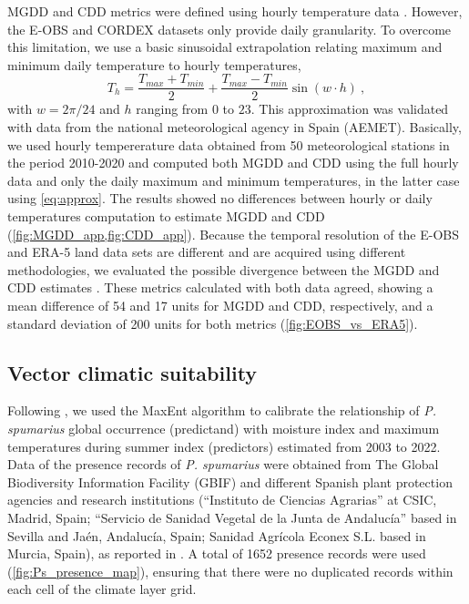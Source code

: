 MGDD and CDD metrics were defined using hourly temperature data
\cite{GimenezRomero2022_CommsBio}. However, the E-OBS and CORDEX datasets only
provide
daily granularity. To overcome this limitation, we use a basic sinusoidal
extrapolation relating maximum and minimum daily temperature to hourly
temperatures,
\begin{equation}\label{eq:approx}
    T_h=\frac{T_{max}+T_{min}}{2} + \frac{T_{max}-T_{min}}{2}\sin(w\cdot h)
    \ ,
\end{equation}
with $w=2\pi/24$ and $h$ ranging from $0$ to $23$. This approximation was
validated with data from the national meteorological agency in Spain (AEMET).
Basically, we used hourly tempererature data obtained from 50 meteorological
stations in the period 2010-2020 and computed both MGDD and CDD using the full
hourly data and only the daily maximum and minimum temperatures, in the latter
case using \cref{eq:approx}. The results showed no differences between hourly
or daily temperatures computation to estimate MGDD and CDD
(\cref{fig:MGDD_app,fig:CDD_app}). Because the temporal resolution
of the E-OBS and ERA-5 land data sets are different and are acquired using
different methodologies, we evaluated the possible divergence between the MGDD
and CDD estimates  \cite{GimenezRomero2022_CommsBio}. These metrics calculated
with
both data agreed, showing a mean difference of 54 and 17 units for MGDD and
CDD, respectively, and a standard deviation of 200 units for both metrics
(\cref{fig:EOBS_vs_ERA5}).

\subsection{Vector climatic suitability}

Following \cite{Godefroid2022_vector}, we used the MaxEnt
\cite{phillips_maximum_2006} algorithm to calibrate the relationship of
\textit{P. spumarius} global occurrence (predictand) with moisture index and
maximum temperatures during summer index (predictors) estimated from 2003 to
2022. Data of the presence records of \textit{P. spumarius} were obtained from
The Global Biodiversity Information Facility (GBIF)
\cite{noauthor_what_nodate,gbiforg_13_2022} and different Spanish plant
protection agencies and research institutions (``Instituto de Ciencias
Agrarias'' at CSIC, Madrid, Spain; ``Servicio de Sanidad Vegetal de la Junta de
Andalucía'' based in Sevilla and Jaén, Andalucía, Spain; Sanidad Agrícola
Econex S.L. based in Murcia, Spain), as reported in
\cite{Godefroid2022_vector}. A total of 1652 presence records were used
(\cref{fig:Ps_presence_map}), ensuring that there were no duplicated records
within each cell of the climate layer grid.

